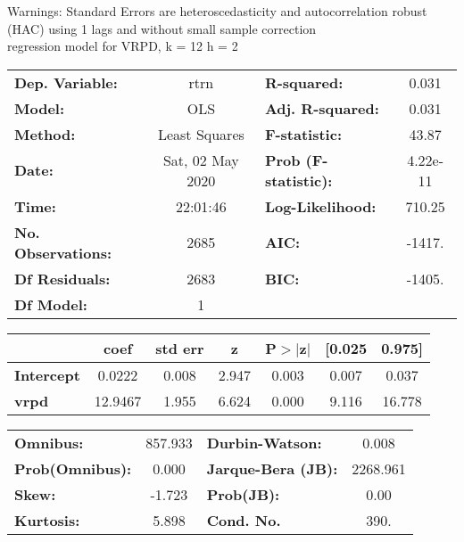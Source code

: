 Warnings: \newline
 [1] Standard Errors are heteroscedasticity and autocorrelation robust (HAC) using 1 lags and without small sample correction\\ 

regression model for VRPD, k = 12 h = 2\begin{center}
\begin{tabular}{lclc}
\toprule
\textbf{Dep. Variable:}    &       rtrn       & \textbf{  R-squared:         } &     0.031   \\
\textbf{Model:}            &       OLS        & \textbf{  Adj. R-squared:    } &     0.031   \\
\textbf{Method:}           &  Least Squares   & \textbf{  F-statistic:       } &     43.87   \\
\textbf{Date:}             & Sat, 02 May 2020 & \textbf{  Prob (F-statistic):} &  4.22e-11   \\
\textbf{Time:}             &     22:01:46     & \textbf{  Log-Likelihood:    } &    710.25   \\
\textbf{No. Observations:} &        2685      & \textbf{  AIC:               } &    -1417.   \\
\textbf{Df Residuals:}     &        2683      & \textbf{  BIC:               } &    -1405.   \\
\textbf{Df Model:}         &           1      & \textbf{                     } &             \\
\bottomrule
\end{tabular}
\begin{tabular}{lcccccc}
                   & \textbf{coef} & \textbf{std err} & \textbf{z} & \textbf{P$> |$z$|$} & \textbf{[0.025} & \textbf{0.975]}  \\
\midrule
\textbf{Intercept} &       0.0222  &        0.008     &     2.947  &         0.003        &        0.007    &        0.037     \\
\textbf{vrpd}      &      12.9467  &        1.955     &     6.624  &         0.000        &        9.116    &       16.778     \\
\bottomrule
\end{tabular}
\begin{tabular}{lclc}
\textbf{Omnibus:}       & 857.933 & \textbf{  Durbin-Watson:     } &    0.008  \\
\textbf{Prob(Omnibus):} &   0.000 & \textbf{  Jarque-Bera (JB):  } & 2268.961  \\
\textbf{Skew:}          &  -1.723 & \textbf{  Prob(JB):          } &     0.00  \\
\textbf{Kurtosis:}      &   5.898 & \textbf{  Cond. No.          } &     390.  \\
\bottomrule
\end{tabular}
\end{center}

